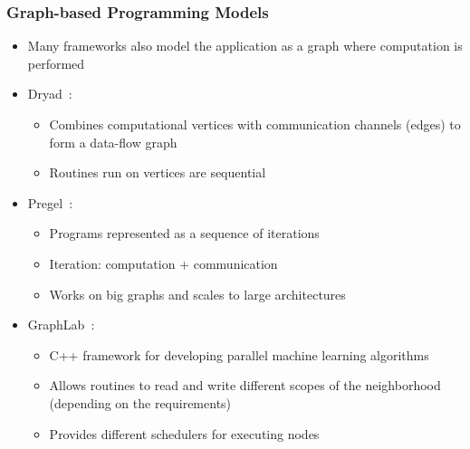 \documentclass{beamer}
\begin{document}
\frame
{
   \frametitle{Graph-based Programming Models}
   \begin{itemize}
      \item Many frameworks also model the application as a graph where computation is performed
      \item Dryad~\cite{Isard:2007:DDD:1272996.1273005}:
      \begin{itemize}
         \item Combines computational vertices with communication channels (edges) to form a data-flow graph
         \item Routines run on vertices are sequential
      \end{itemize}
      \item Pregel~\cite{Malewicz:2010:PSL:1807167.1807184}:
      \begin{itemize}
         \item Programs represented as a sequence of iterations
         \item Iteration: computation + communication
         \item Works on big graphs and scales to large architectures
      \end{itemize}
      \item GraphLab~\cite{GraphLab2010}:
      \begin{itemize}
         \item C++ framework for developing parallel machine learning algorithms
         \item Allows routines to read and write different scopes of the neighborhood (depending on the requirements)
         \item Provides different schedulers for executing nodes
      \end{itemize}
   \end{itemize}
}
\end{document}
